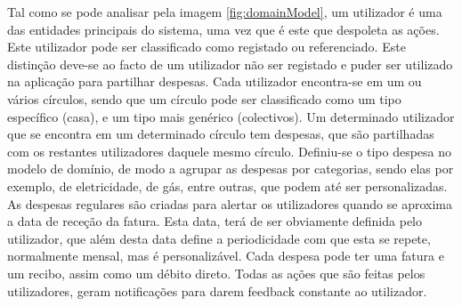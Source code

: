 Tal como se pode analisar pela imagem \ref{fig:domainModel}, um utilizador é uma das entidades principais do sistema, uma vez que é este que despoleta as ações. Este utilizador pode ser classificado como registado ou referenciado. Este distinção deve-se ao facto de um utilizador não ser registado e puder ser utilizado na aplicação para partilhar despesas.
Cada utilizador encontra-se em um ou vários círculos, sendo que um círculo pode ser classificado como um tipo específico (casa), e um tipo mais genérico (colectivos).
Um determinado utilizador que se encontra em um determinado círculo tem despesas, que são partilhadas com os restantes utilizadores daquele mesmo círculo.
Definiu-se o tipo despesa no modelo de domínio, de modo a agrupar as despesas por categorias, sendo elas por exemplo, de eletricidade, de gás, entre outras, que podem até ser personalizadas.
As despesas regulares são criadas para alertar os utilizadores quando se aproxima a data de receção da fatura. Esta data, terá de ser obviamente definida pelo utilizador, que além desta data define a periodicidade com que esta se repete, normalmente mensal, mas é personalizável.
Cada despesa pode ter uma fatura e um recibo, assim como um débito direto.
Todas as ações que são feitas pelos utilizadores, geram notificações para darem feedback constante ao utilizador.
